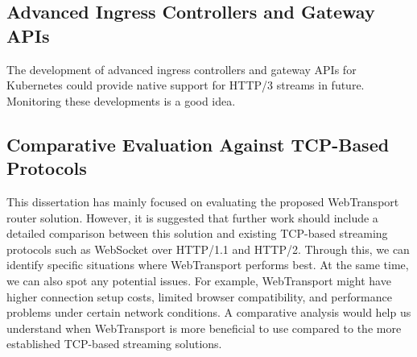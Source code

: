 \subsection{Advanced Ingress Controllers and Gateway APIs}
The development of advanced ingress controllers and gateway APIs for Kubernetes could provide native support for HTTP/3 streams in future. Monitoring these developments is a good idea.

\subsection{Comparative Evaluation Against TCP-Based Protocols}
This dissertation has mainly focused on evaluating the proposed WebTransport router solution. However, it is suggested that further work should include a detailed comparison between this solution and existing TCP-based streaming protocols such as WebSocket over HTTP/1.1 and HTTP/2. Through this, we can identify specific situations where WebTransport performs best. At the same time, we can also spot any potential issues. For example, WebTransport might have higher connection setup costs, limited browser compatibility, and performance problems under certain network conditions. A comparative analysis would help us understand when WebTransport is more beneficial to use compared to the more established TCP-based streaming solutions.

